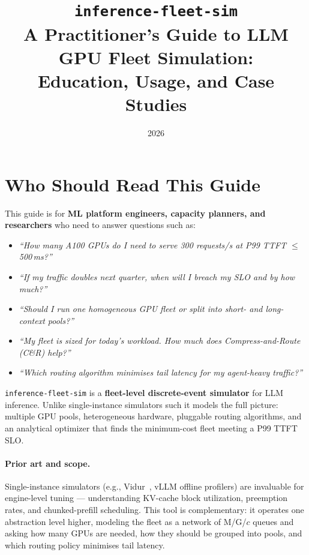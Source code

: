 \documentclass[11pt,a4paper]{article}
\title{%
  \texttt{inference-fleet-sim}\\[4pt]
  \large A Practitioner's Guide to LLM GPU Fleet Simulation:\\
  Education, Usage, and Case Studies%
}
\date{2026}
\begin{document}
\maketitle
\tableofcontents
\newpage

\section{Who Should Read This Guide}
\label{sec:intro}

This guide is for \textbf{ML platform engineers, capacity planners, and
researchers} who need to answer questions such as:

\begin{itemize}[nosep]
  \item \textit{``How many A100 GPUs do I need to serve 300 requests/s
    at P99 TTFT $\leq$ 500\,ms?''}
  \item \textit{``If my traffic doubles next quarter, when will I
    breach my SLO and by how much?''}
  \item \textit{``Should I run one homogeneous GPU fleet or split into
    short- and long-context pools?''}
  \item \textit{``My fleet is sized for today's workload. How much
    does Compress-and-Route (C\&R) help?''}
  \item \textit{``Which routing algorithm minimises tail latency for
    my agent-heavy traffic?''}
\end{itemize}

\texttt{inference-fleet-sim} is a \textbf{fleet-level discrete-event
simulator} for LLM inference.  Unlike single-instance simulators such
it models the full picture: multiple GPU pools, heterogeneous hardware,
pluggable routing algorithms, and an analytical optimizer that finds the
minimum-cost fleet meeting a P99 TTFT SLO.

\paragraph{Prior art and scope.}
Single-instance simulators (e.g., Vidur~\citep{vidur2024},
vLLM offline profilers) are invaluable for engine-level tuning ---
understanding KV-cache block utilization, preemption rates, and
chunked-prefill scheduling.  This tool is complementary: it operates
one abstraction level higher, modeling the fleet as a network of M/G/$c$
queues and asking how many GPUs are needed, how they should be grouped
into pools, and which routing policy minimises tail latency.
\end{document}
